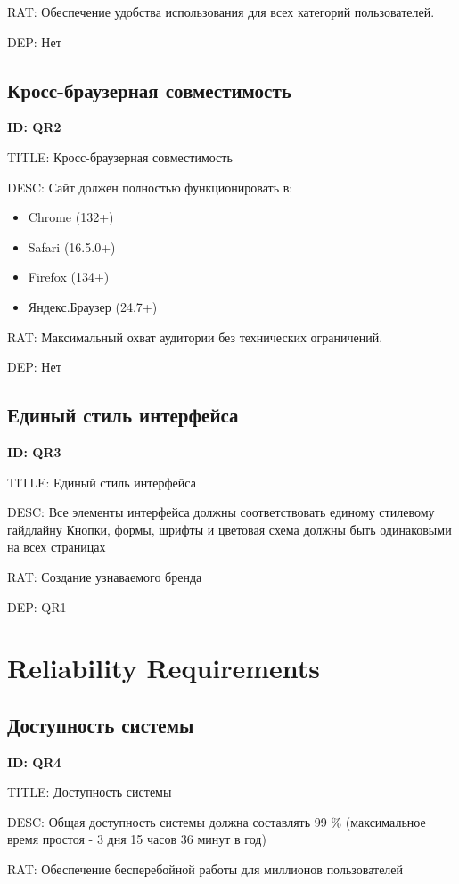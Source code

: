 \documentclass{scrreprt}
\begin{document}
RAT: Обеспечение удобства использования для всех категорий пользователей.

DEP: Нет
\subsection{Кросс-браузерная совместимость}
\textbf{ID: QR2}

TITLE: Кросс-браузерная совместимость

DESC:
Сайт должен полностью функционировать в:
\begin{itemize}
\item Chrome (132+)

\item Safari (16.5.0+)

\item Firefox (134+)

\item Яндекс.Браузер (24.7+)

\end{itemize}

RAT: Максимальный охват аудитории без технических ограничений.

DEP: Нет

\subsection{Единый стиль интерфейса}
\textbf{ID: QR3}

TITLE: Единый стиль интерфейса

DESC:
Все элементы интерфейса должны соответствовать единому стилевому гайдлайну
Кнопки, формы, шрифты и цветовая схема должны быть одинаковыми на всех страницах

RAT: Создание узнаваемого бренда

DEP: QR1
\section{Reliability Requirements}
\subsection{Доступность системы}
\textbf{ID: QR4}

TITLE: Доступность системы

DESC:
Общая доступность системы должна составлять 99 \% (максимальное время простоя - 3 дня 15 часов 36 минут в год)

RAT: Обеспечение бесперебойной работы для миллионов пользователей
\end{document}
